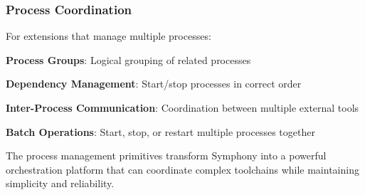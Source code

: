 \subsubsection*{Process Coordination}

For extensions that manage multiple processes:

\begin{compactlist}
    \item \textbf{Process Groups}: Logical grouping of related processes
    \item \textbf{Dependency Management}: Start/stop processes in correct order
    \item \textbf{Inter-Process Communication}: Coordination between multiple external tools
    \item \textbf{Batch Operations}: Start, stop, or restart multiple processes together
\end{compactlist}

\begin{alertbox}
The process management primitives transform Symphony into a powerful orchestration platform that can coordinate complex toolchains while maintaining simplicity and reliability.
\end{alertbox}
